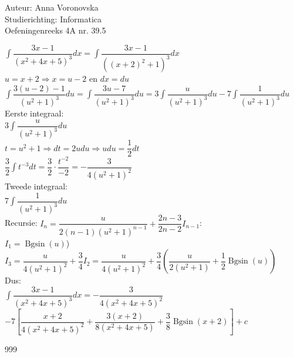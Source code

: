 \documentclass[a4paper]{article}
\begin{document}
  
\noindent \large Auteur: Anna Voronovska \\
\noindent \large Studierichting: Informatica\\
\noindent \large Oefeningenreeks 4A nr. 39.5\\

\medskip

\normalsize


$\displaystyle\int \dfrac{3x - 1}{(x^2 + 4x + 5)^3}dx = \displaystyle\int \dfrac{3x - 1}{((x + 2)^2 + 1)^3}dx$\\

$u = x + 2 \Rightarrow x = u - 2$ en $dx = du$\\

$\displaystyle\int \dfrac{3(u-2) - 1}{(u^2 + 1)^3}du = \displaystyle\int \dfrac{3u - 7}{(u^2 + 1)^3}du = 3\displaystyle\int \dfrac{u}{(u^2 + 1)^3}du - 7\displaystyle\int \dfrac{1}{(u^2 + 1)^3}du$\\

Eerste integraal:\\

$3\displaystyle\int \dfrac{u}{(u^2 + 1)^3}du$\\

$t = u^2 + 1 \Rightarrow dt = 2udu \Rightarrow udu = \dfrac{1}{2}dt$\\

$\dfrac{3}{2} \displaystyle\int t^{-3}dt = \dfrac{3}{2} \cdot \dfrac{t^{-2}}{-2} = -\dfrac{3}{4(u^2 + 1)^2}$\\

Tweede integraal:\\

$7\displaystyle\int \dfrac{1}{(u^2 + 1)^3}du$\\

Recursie: $I_n = \dfrac{u}{2(n-1)(u^2+1)^{n-1}} + \dfrac{2n-3}{2n-2}I_{n-1}$:\\

$I_1 = \operatorname{Bgsin}(u)$)\\

$I_3 = \dfrac{u}{4(u^2+1)^2} + \dfrac{3}{4}I_2 = \dfrac{u}{4(u^2+1)^2} + \dfrac{3}{4} \left( \dfrac{u}{2(u^2+1)} + \dfrac{1}{2}\operatorname{Bgsin}(u) \right)$\\

Dus:\\

$\displaystyle\int \dfrac{3x - 1}{(x^2 + 4x + 5)^3}dx = -\dfrac{3}{4(x^2+4x+5)^2} $\\

$- 7 \left[ \dfrac{x+2}{4(x^2+4x+5)^2} + \dfrac{3(x+2)}{8(x^2+4x+5)} + \dfrac{3}{8}\operatorname{Bgsin}(x+2) \right] + c$


\begin{thebibliography}{999}
\end{thebibliography}
\end{document}
